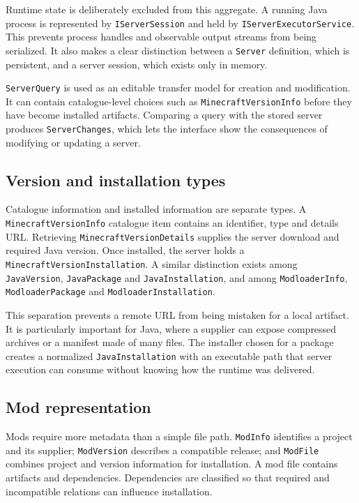 Runtime state is deliberately excluded from this aggregate. A running Java process is represented by \texttt{IServerSession} and held by \texttt{IServerExecutorService}. This prevents process handles and observable output streams from being serialized. It also makes a clear distinction between a \texttt{Server} definition, which is persistent, and a server session, which exists only in memory.

\texttt{ServerQuery} is used as an editable transfer model for creation and modification. It can contain catalogue-level choices such as \texttt{MinecraftVersionInfo} before they have become installed artifacts. Comparing a query with the stored server produces \texttt{ServerChanges}, which lets the interface show the consequences of modifying or updating a server.

\subsection{Version and installation types}

Catalogue information and installed information are separate types. A \texttt{MinecraftVersionInfo} catalogue item contains an identifier, type and details URL. Retrieving \texttt{MinecraftVersionDetails} supplies the server download and required Java version. Once installed, the server holds a \texttt{MinecraftVersionInstallation}. A similar distinction exists among \texttt{JavaVersion}, \texttt{JavaPackage} and \texttt{JavaInstallation}, and among \texttt{ModloaderInfo}, \texttt{ModloaderPackage} and \texttt{ModloaderInstallation}.

This separation prevents a remote URL from being mistaken for a local artifact. It is particularly important for Java, where a supplier can expose compressed archives or a manifest made of many files. The installer chosen for a package creates a normalized \texttt{JavaInstallation} with an executable path that server execution can consume without knowing how the runtime was delivered.

\subsection{Mod representation}

Mods require more metadata than a simple file path. \texttt{ModInfo} identifies a project and its supplier; \texttt{ModVersion} describes a compatible release; and \texttt{ModFile} combines project and version information for installation. A mod file contains artifacts and dependencies. Dependencies are classified so that required and incompatible relations can influence installation.

